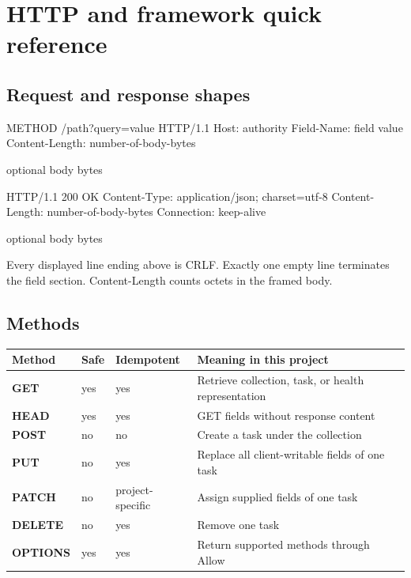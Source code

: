 \chapter{HTTP and framework quick reference}

\section{Request and response shapes}

\begin{wiremessage}
METHOD /path?query=value HTTP/1.1
Host: authority
Field-Name: field value
Content-Length: number-of-body-bytes

optional body bytes
\end{wiremessage}

\begin{wiremessage}
HTTP/1.1 200 OK
Content-Type: application/json; charset=utf-8
Content-Length: number-of-body-bytes
Connection: keep-alive

optional body bytes
\end{wiremessage}

Every displayed line ending above is CRLF. Exactly one empty line terminates the
field section. Content-Length counts octets in the framed body.

\section{Methods}

\begin{longtable}{@{}>{\bfseries}p{20mm}p{20mm}p{24mm}p{83mm}@{}}
\toprule
Method & Safe & Idempotent & Meaning in this project \\
\midrule
\endhead
GET & yes & yes & Retrieve collection, task, or health representation \\
HEAD & yes & yes & GET fields without response content \\
POST & no & no & Create a task under the collection \\
PUT & no & yes & Replace all client-writable fields of one task \\
PATCH & no & project-specific & Assign supplied fields of one task \\
DELETE & no & yes & Remove one task \\
OPTIONS & yes & yes & Return supported methods through Allow \\
\bottomrule
\end{longtable}

